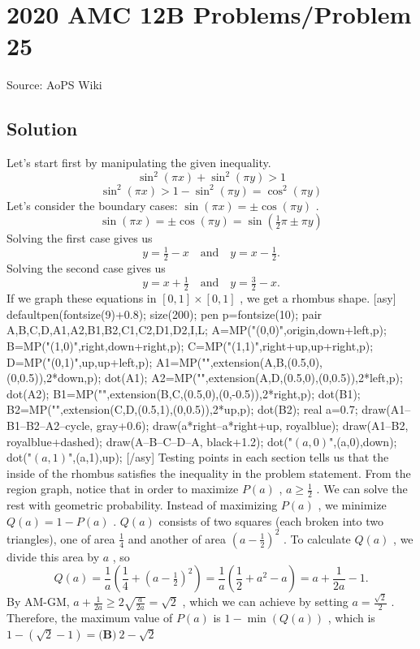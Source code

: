 \documentclass[12pt]{article}
\begin{document}
\section*{{2020 AMC 12B Problems/Problem 25}}
Source: AoPS Wiki

\subsection*{Solution}
Let's start first by manipulating the given inequality. \[\sin^{2}{(\pi x)}+\sin^{2}{(\pi y)}>1\] \[\sin^{2}{(\pi x)}>1-\sin^{2}{(\pi y)}=\cos^{2}{(\pi y)}\] Let's consider the boundary cases: $\sin{(\pi x)}=\pm \cos{(\pi y)}$ . \[\sin{(\pi x)}=\pm \cos{(\pi y)}=\sin{(\tfrac 12 {\pi}\pm \pi y)}\] Solving the first case gives us \[y=\tfrac{1}{2}-x \quad \textrm{and} \quad y=x-\tfrac{1}{2}.\] Solving the second case gives us \[y=x+\tfrac{1}{2}\quad \textrm{and} \quad y=\tfrac{3}{2}-x.\] If we graph these equations in $[0,1]\times[0,1]$ , we get a rhombus shape. [asy] defaultpen(fontsize(9)+0.8); size(200); pen p=fontsize(10); pair A,B,C,D,A1,A2,B1,B2,C1,C2,D1,D2,I,L; A=MP("(0,0)",origin,down+left,p); B=MP("(1,0)",right,down+right,p); C=MP("(1,1)",right+up,up+right,p); D=MP("(0,1)",up,up+left,p); A1=MP("",extension(A,B,(0.5,0),(0,0.5)),2*down,p); dot(A1); A2=MP("",extension(A,D,(0.5,0),(0,0.5)),2*left,p); dot(A2); B1=MP("",extension(B,C,(0.5,0),(0,-0.5)),2*right,p); dot(B1); B2=MP("",extension(C,D,(0.5,1),(0,0.5)),2*up,p); dot(B2); real a=0.7; draw(A1--B1--B2--A2--cycle, gray+0.6); draw(a*right--a*right+up, royalblue); draw(A1--B2, royalblue+dashed); draw(A--B--C--D--A, black+1.2); dot("$(a,0)$",(a,0),down); dot("$(a,1)$",(a,1),up); [/asy] Testing points in each section tells us that the inside of the rhombus satisfies the inequality in the problem statement. From the region graph, notice that in order to maximize $P(a)$ , $a\geq\tfrac{1}{2}$ . We can solve the rest with geometric probability. Instead of maximizing $P(a)$ , we minimize $Q(a)=1-P(a)$ . $Q(a)$ consists of two squares (each broken into two triangles), one of area $\tfrac{1}{4}$ and another of area $(a-\tfrac 12)^2$ . To calculate $Q(a)$ , we divide this area by $a$ , so \[Q(a) = \frac{1}{a}\left(\frac{1}{4}+(a-\tfrac 12)^2\right) = \frac{1}{a}\left(\frac{1}{2}+a^2-a\right)= a+\frac 1{2a}-1.\] By AM-GM, $a+\frac{1}{2a}\geq 2\sqrt{\frac{a}{2a}}=\sqrt{2}$ , which we can achieve by setting $a=\frac{\sqrt{2}}{2}$ . Therefore, the maximum value of $P(a)$ is $1-\min(Q(a))$ , which is $1-(\sqrt{2}-1) =\boxed{\textbf{(B)}\ 2 - \sqrt{2}}$
\end{document}
